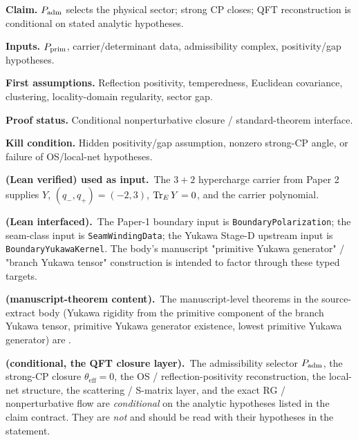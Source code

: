 \documentclass[11pt,a4paper]{article}
\begin{document}
\begin{tfptclaimcontract}
\textbf{Claim.} $P_{\mathrm{adm}}$ selects the physical sector; strong CP closes; QFT reconstruction is conditional on stated analytic hypotheses.\par
\textbf{Inputs.} $P_{\mathrm{prim}}$, carrier/determinant data, admissibility complex, positivity/gap hypotheses.\par
\textbf{First assumptions.} Reflection positivity, temperedness, Euclidean covariance, clustering, locality-domain regularity, sector gap.\par
\textbf{Proof status.} Conditional nonperturbative closure / standard-theorem interface.\par
\textbf{Kill condition.} Hidden positivity/gap assumption, nonzero strong-CP angle, or failure of OS/local-net hypotheses.\par
\end{tfptclaimcontract}

\begin{tfptstatusbox}
\textbf{ (Lean verified) used as input.}\ The $3+2$
hypercharge carrier from Paper 2 supplies $Y$,
$(q_-,q_+) = (-2,3)$, $\operatorname{Tr}_E Y = 0$, and the carrier polynomial.

\smallskip
\textbf{ (Lean interfaced).}\ The Paper-1 boundary
input is \texttt{BoundaryPolarization}; the seam-class input
is \texttt{SeamWindingData}; the Yukawa Stage-D upstream input
is \texttt{BoundaryYukawaKernel}. The body's manuscript
"primitive Yukawa generator" / "branch Yukawa tensor"
construction is intended to factor through these typed
targets.

\smallskip
\textbf{ (manuscript-theorem content).}\ The
manuscript-level theorems in the source-extract body
(Yukawa rigidity from the primitive component of the branch
Yukawa tensor, primitive Yukawa generator existence, lowest
primitive Yukawa generator) are .

\smallskip
\textbf{ (conditional, the QFT closure layer).}\ The
admissibility selector $P_{\mathrm{adm}}$, the strong-CP closure
$\theta_{\mathrm{eff}} = 0$, the OS / reflection-positivity
reconstruction, the local-net structure, the scattering /
S-matrix layer, and the exact RG / nonperturbative flow are
\emph{conditional} on the analytic hypotheses listed in the
claim contract. They are \emph{not}  and should be
read with their hypotheses in the statement.
\end{tfptstatusbox}

\tableofcontents
\end{document}
